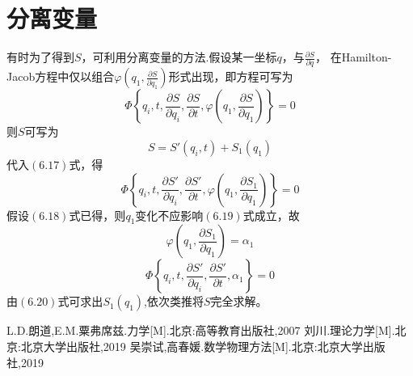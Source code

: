 \section{分离变量}
有时为了得到$S$，可利用分离变量的方法.假设某一坐标$q$，与$\displaystyle{\frac{\partial S}{\partial q}}$，
在Hamilton-Jacob方程中仅以组合$\displaystyle{\varphi(q_1,\frac{\partial S}{\partial q_1})}$形式出现，即方程可写为
\begin{equation}
    \varPhi\left\{q_i,t,\frac{\partial S}{\partial q_i},\frac{\partial S}{\partial t},
    \varphi\left(q_1,\frac{\partial S}{\partial q_1}\right)\right\}=0
\end{equation}
则$S$可写为
\begin{equation}
    S=S'(q_i,t)+S_1(q_1)
\end{equation}
代入$(6.17)$式，得
\begin{equation}
    \varPhi\left\{q_i,t,\frac{\partial S'}{\partial q_i},\frac{\partial S'}{\partial t},
    \varphi\left(q_1,\frac{\partial S_1}{\partial q_1}\right)\right\}=0
\end{equation}
假设$(6.18)$式已得，则$q_1$变化不应影响$(6.19)$式成立，故
\begin{equation}
    \varphi\left(q_1,\frac{\partial S_1}{\partial q_1}\right)=\alpha_1
\end{equation}
\begin{equation}
    \varPhi\left\{q_i,t,\frac{\partial S'}{\partial q_i},\frac{\partial S'}{\partial t},\alpha_1\right\}=0
\end{equation}
由$(6.20)$式可求出$S_1(q_1)$,依次类推将$S$完全求解。


\renewcommand{\bibname}{参考书目}
\begin{thebibliography}{3}
	 L.D.朗道,E.M.粟弗席兹.力学[M].北京:高等教育出版社,2007
	 刘川.理论力学[M].北京:北京大学出版社,2019
	 吴崇试,高春媛.数学物理方法[M].北京:北京大学出版社,2019
\end{thebibliography}

